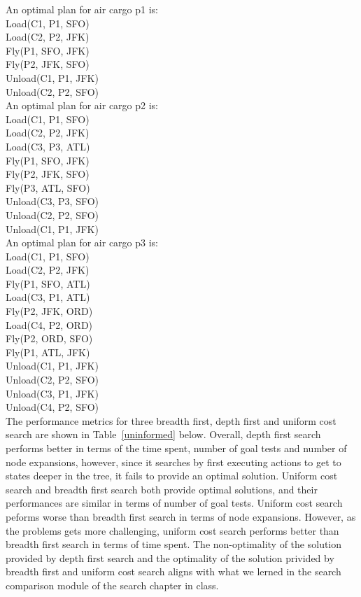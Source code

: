\documentclass[11pt]{article}
\begin{document}
An optimal plan for air cargo p1 is:\\

Load(C1, P1, SFO)\\
Load(C2, P2, JFK)\\
Fly(P1, SFO, JFK)\\
Fly(P2, JFK, SFO)\\
Unload(C1, P1, JFK)\\
Unload(C2, P2, SFO)\\

An optimal plan for air cargo p2 is:\\

Load(C1, P1, SFO)\\
Load(C2, P2, JFK)\\
Load(C3, P3, ATL)\\
Fly(P1, SFO, JFK)\\
Fly(P2, JFK, SFO)\\
Fly(P3, ATL, SFO)\\
Unload(C3, P3, SFO)\\
Unload(C2, P2, SFO)\\
Unload(C1, P1, JFK)\\

An optimal plan for air cargo p3 is:\\

Load(C1, P1, SFO)\\
Load(C2, P2, JFK)\\
Fly(P1, SFO, ATL)\\
Load(C3, P1, ATL)\\
Fly(P2, JFK, ORD)\\
Load(C4, P2, ORD)\\
Fly(P2, ORD, SFO)\\
Fly(P1, ATL, JFK)\\
Unload(C1, P1, JFK)\\
Unload(C2, P2, SFO)\\
Unload(C3, P1, JFK)\\
Unload(C4, P2, SFO)\\



The performance metrics for three breadth first, depth first and uniform cost search are shown in Table~\ref{uninformed} below.
Overall, depth first search performs better in terms of the time spent, number of goal tests and number of node expansions, however, since 
it searches by first executing actions to get to states deeper in the tree, it fails to provide an optimal solution. Uniform cost search and breadth first search 
both provide optimal solutions, and their performances are similar in terms of number of goal tests. Uniform cost search peforms worse than breadth first search in terms of node expansions.
However, as the problems gets more challenging, uniform cost search performs better than breadth first search in terms of time spent. The non-optimality of the solution provided by depth first search and the optimality of the solution privided by breadth first and uniform cost search aligns with what we lerned in the search comparison module of the search chapter in class. \\
\end{document}
